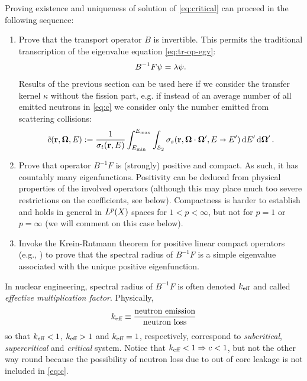 Proving existence and uniqueness of solution of \eqref{eq:critical} can proceed in the following sequence:
\begin{enumerate}
	\item
		Prove that the transport operator $B$ is invertible. This permits the traditional transcription of the eigenvalue equation \eqref{eq:tr-op-egv}:
		$$
		B^{-1}F\psi = \lambda\psi.
		$$
		Results of the previous section can be used here if we consider the transfer kernel $\kappa$ without the fission part,
		e.g. if instead of an average number of all emitted neutrons in \eqref{eq:c} we consider only the number emitted
		from scattering collisions: 
		\begin{equation}\label{eq:tildec}
		\tilde c(\mathbf{r},\mathbf{\Omega},E) := \frac{1}{\sigma_t(\mathbf{r},E)}\int_{E_{\text{min}}}^{E_{\text{max}}}\int_{\mathcal{S}_2}
		\sigma_s(\mathbf{r},\mathbf{\Omega}\cdot\mathbf{\Omega}', E\shortrightarrow E')\,\text{d}E'\,\text{d}\mathbf{\Omega}'\,.
	    \end{equation}
	\item
		Prove that operator $B^{-1}F$ is (strongly) positive and compact. As such, it has countably many eigenfunctions. 
		Positivity can be deduced from physical properties of the involved operators (although this may place much too severe
		restrictions on the coefficients, see below). Compactness is harder to establish and holds in general in $L^{p}(X)$
		spaces for $1 < p < \infty$, but not for $p = 1$ or $p = \infty$ (we will comment on this case below).
	\item
		Invoke the Krein-Rutmann theorem for positive linear compact operators (e.g., \cite[Thm. 5.4.33]{DrabekNFA}) to prove
		that the spectral radius of $B^{-1}F$ is a simple eigenvalue associated with the unique positive eigenfunction.
\end{enumerate}
\begin{remark}
In nuclear engineering, spectral radius of $B^{-1}F$ is often denoted $k_{\text{eff}}$
and called \textit{effective multiplication factor}. Physically,
$$
k_{\text{eff}} \equiv \frac{\mbox{neutron emission}}{\mbox{neutron loss}}
$$
so that 
$k_{\text{eff}} < 1$, $k_{\text{eff}} > 1$ and $k_{\text{eff}} = 1$, respectively, correspond to \textit{subcritical},
\textit{supercritical} and \textit{critical} system. Notice that $k_{\text{eff}} < 1 \Rightarrow c < 1$, but not the other way
round because the possibility of neutron loss due to out of core leakage is not included in \eqref{eq:c}. 
\end{remark}

